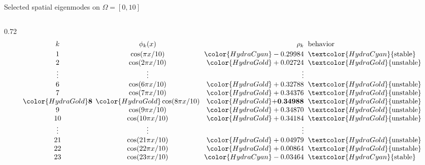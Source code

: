\begin{frame}{Selected spatial eigenmodes on $\Omega=[0,10]$}
\begin{columns}[c,onlytextwidth]
    \begin{column}{0.72\textwidth}
      {\color{HydraWhite}\fontsize{6.5}{7.8}\selectfont
      \renewcommand{\arraystretch}{0.86}
      \begin{align*}
        \begin{array}{c@{\hspace{0.16cm}}c@{\hspace{0.22cm}}r@{\hspace{0.20cm}}l}
      k
      &
      \phi_k(x)
      &
      \rho_k
      &
      \text{behavior}
      \\[0.08cm]
      1
      &
      \cos(\pi x/10)
      &
      {\color{HydraCyan}-0.29984}
      &
      \textcolor{HydraCyan}{\text{stable}}
      \\
      2
      &
      \cos(2\pi x/10)
      &
      {\color{HydraGold}+0.02724}
      &
      \textcolor{HydraGold}{\text{unstable}}
      \\
      \vdots
      &
      \vdots
      &
      \vdots
      &
      \\
      6
      &
      \cos(6\pi x/10)
      &
      {\color{HydraGold}+0.32788}
      &
      \textcolor{HydraGold}{\text{unstable}}
      \\
      7
      &
      \cos(7\pi x/10)
      &
      {\color{HydraGold}+0.34376}
      &
      \textcolor{HydraGold}{\text{unstable}}
      \\
      {\color{HydraGold}\mathbf{8}}
      &
      {\color{HydraGold}\cos(8\pi x/10)}
      &
      {\color{HydraGold}\mathbf{+0.34988}}
      &
      \textcolor{HydraGold}{\text{unstable}}
      \\
      9
      &
      \cos(9\pi x/10)
      &
      {\color{HydraGold}+0.34870}
      &
      \textcolor{HydraGold}{\text{unstable}}
      \\
      10
      &
      \cos(10\pi x/10)
      &
      {\color{HydraGold}+0.34184}
      &
      \textcolor{HydraGold}{\text{unstable}}
      \\
      \vdots
      &
      \vdots
      &
      \vdots
      &
      \\
      21
      &
      \cos(21\pi x/10)
      &
      {\color{HydraGold}+0.04979}
      &
      \textcolor{HydraGold}{\text{unstable}}
      \\
      22
      &
      \cos(22\pi x/10)
      &
      {\color{HydraGold}+0.00864}
      &
      \textcolor{HydraGold}{\text{unstable}}
      \\
      23
      &
      \cos(23\pi x/10)
      &
      {\color{HydraCyan}-0.03464}
      &
      \textcolor{HydraCyan}{\text{stable}}
        \end{array}
      \end{align*}
      }
    \end{column}


\end{columns}
\end{frame}
